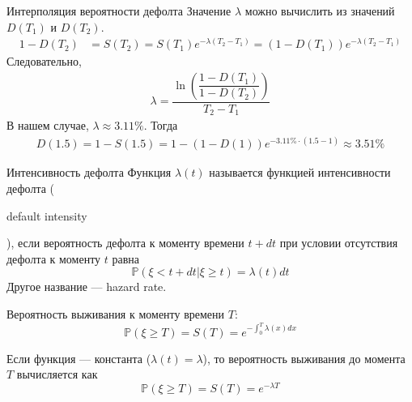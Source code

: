 \documentclass{beamer}
\newcommand{\en}[1]{\begin{otherlanguage}{english}#1\end{otherlanguage}}
\begin{document}
\begin{frame}{Интерполяция вероятности дефолта}
\justify
Значение $\lambda$ можно вычислить из значений $D(T_1)$ и $D(T_2)$.
\begin{align*}
1 - D(T_2) &= S(T_2) = S(T_1)e^{-\lambda(T_2-T_1)} = (1 - D(T_1))e^{-\lambda(T_2-T_1)}
\end{align*}
Следовательно,
\begin{align*}
\lambda = \dfrac{\ln\left(\dfrac{1 - D(T_1)}{1 - D(T_2)}\right)}{T_2 - T_1}
\end{align*}
В нашем случае, $\lambda \approx 3.11\%$. Тогда
\begin{align*}
D(1.5) = 1 - S(1.5) = 1 - (1 - D(1))e^{-3.11\% \cdot (1.5 - 1)} \approx 3.51\%
\end{align*}
\end{frame}



\begin{frame}{Интенсивность дефолта}
\justify
Функция $\lambda(t)$ называется \alert{функцией интенсивности дефолта} (\en{default intensity}), если вероятность дефолта к моменту времени $t+dt$ при условии отсутствия дефолта к моменту $t$ равна
\begin{equation*}
\mathbb{P}(\xi < t+dt | \xi \ge t) = \lambda(t)dt
\end{equation*}
Другое название --- hazard rate.

\justify
Вероятность выживания к моменту времени $T$:
\begin{equation*}
\mathbb{P}(\xi \ge T) = S(T) = e^{-\int_0^T\lambda(x)dx}
\end{equation*}

\justify
Если функция --- константа ($\lambda(t)=\lambda$), то вероятность выживания до момента $T$ вычисляется как
\begin{equation*}
\mathbb{P}(\xi \ge T) = S(T) = e^{-\lambda T}
\end{equation*}
\end{frame}
\end{document}
